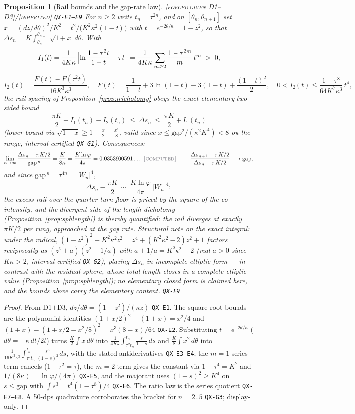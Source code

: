 \documentclass[11pt]{article}
\newcommand{\tagFD}{\textcolor{cF}{\textsc{[forced}}\,\textcolor{cD}{\textsc{given D1--D3]}}}
\newcommand{\tagC}{\textcolor{cC}{\textsc{[computed]}}}
\newcommand{\tagI}{\textcolor{cI}{\textsc{[inherited]}}}
\newcommand{\hx}[1]{\textcolor{cC}{\footnotesize\texttt{#1}}}
\newcommand{\gp}{\varphi}
\newcommand{\gapc}{\mathrm{gap}}
\theoremstyle{plain}
\newtheorem{proposition}[theorem]{Proposition}
\theoremstyle{definition}
\theoremstyle{remark}
\begin{document}
\begin{proposition}[Rail bounds and the gap-rate law]\label{prop:railbounds}\tagFD{}/\tagI{} \hx{QX-E1--E9}
For $n\ge2$ write $t_n=\tau^{2n}$, and on $[\theta_n,\theta_{n+1}]$ set
$x=(dz/d\theta)^2/K^2=t^2/\bigl(K^2\kappa^2(1-t)\bigr)$ with
$t=e^{-2\theta/\kappa}=1-z^2$, so that
$\Delta s_n=K\int_{\theta_n}^{\theta_{n+1}}\sqrt{1+x}\;d\theta$. With
\[
I_1(t)=\frac1{4K\kappa}\Bigl[\ln\frac{1-\tau^2t}{1-t}-\tau t\Bigr]
=\frac1{4K\kappa}\sum_{m\ge2}\frac{1-\tau^{2m}}{m}\,t^m\;>\;0,
\]
\[
I_2(t)=\frac{F(t)-F(\tau^2t)}{16K^3\kappa^3},
\quad
F(t)=\frac1{1-t}+3\ln(1-t)-3(1-t)+\frac{(1-t)^2}2,
\quad
0<I_2(t)\le\frac{1-\tau^8}{64K^7\kappa^3}\,t^4,
\]
the rail spacing of Proposition~\ref{prop:trichotomy} obeys the exact
elementary two-sided bound
\[
\boxed{\ \frac{\pi K}2+I_1(t_n)-I_2(t_n)\ \le\ \Delta s_n\ \le\
\frac{\pi K}2+I_1(t_n)\ }
\]
(lower bound via $\sqrt{1+x}\ge1+\tfrac x2-\tfrac{x^2}8$, valid since
$x\le\gapc^2/(\kappa^2K^4)<8$ on the range, interval-certified
\hx{QX-G1}). Consequences:
\[
\lim_{n\to\infty}\frac{\Delta s_n-\pi K/2}{\gapc^{\,n}}
=\frac{K}{8\kappa}=\frac{K\ln\gp}{4\pi}=0.0353900591\ldots\ \tagC{},
\qquad
\frac{\Delta s_{n+1}-\pi K/2}{\Delta s_n-\pi K/2}\longrightarrow\gapc,
\]
and since $\gapc^{\,n}=\tau^{4n}=|W_n|^4$,
\[
\Delta s_n-\frac{\pi K}2\ \sim\ \frac{K\ln\gp}{4\pi}\,|W_n|^4:
\]
the excess rail over the quarter-turn floor is priced by the square of the
co-intensity, and the divergent side of the length dichotomy
(Proposition~\ref{prop:sphlength}) is thereby quantified: the rail
diverges at exactly $\pi K/2$ per rung, approached at the gap rate.
Structural note on the exact integral: under the radical,
$(1-z^2)^2+K^2\kappa^2z^2=z^4+(K^2\kappa^2-2)z^2+1$ factors reciprocally
as $(z^2+a)(z^2+1/a)$ with $a+1/a=K^2\kappa^2-2$ (real $a>0$ since
$K\kappa>2$, interval-certified \hx{QX-G2}), placing $\Delta s_n$ in
incomplete-elliptic form --- in contrast with the residual sphere, whose
total length closes in a \emph{complete} elliptic value
(Proposition~\ref{prop:sphlength}); no elementary closed form is claimed
here, and the bounds above carry the elementary content. \hx{QX-E9}
\end{proposition}

\begin{proof}
From D1$+$D3, $dz/d\theta=(1-z^2)/(\kappa z)$ \hx{QX-E1}. The square-root
bounds are the polynomial identities $(1+x/2)^2-(1+x)=x^2/4$ and
$(1+x)-(1+x/2-x^2/8)^2=x^3(8-x)/64$ \hx{QX-E2}. Substituting
$t=e^{-2\theta/\kappa}$ ($d\theta=-\kappa\,dt/2t$) turns
$\tfrac K2\!\int x\,d\theta$ into
$\tfrac1{4K\kappa}\!\int_{\tau^2t_n}^{t_n}\!\tfrac s{1-s}\,ds$ and
$\tfrac K8\!\int x^2\,d\theta$ into
$\tfrac1{16K^3\kappa^3}\!\int_{\tau^2t_n}^{t_n}\!\tfrac{s^3}{(1-s)^2}\,ds$,
with the stated antiderivatives \hx{QX-E3--E4}; the $m=1$ series term
cancels ($1-\tau^2=\tau$), the $m=2$ term gives the constant via
$1-\tau^4=K^2$ and $1/(8\kappa)=\ln\gp/(4\pi)$ \hx{QX-E5}, and the
majorant uses $(1-s)^2\ge K^4$ on $s\le\gapc$ with
$\int s^3=t^4(1-\tau^8)/4$ \hx{QX-E6}. The ratio law is the series
quotient \hx{QX-E7--E8}. A 50-dps quadrature corroborates the bracket for
$n=2..5$ \hx{QX-G3}; display-only.
\end{proof}
\end{document}
